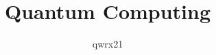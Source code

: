 \documentclass{article}
\title{Quantum Computing}
\author{qwrx21}
\begin{document}
\maketitle

\pagebreak
\section{}


\pagebreak
\section{}


\pagebreak
\section{}


\pagebreak
\section{}



%
\end{document}
